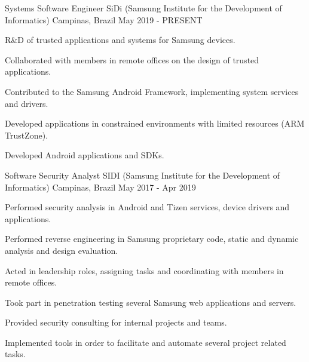 
\begin{cventries}

  \cventry
    {Systems Software Engineer} %
    {SiDi (Samsung Institute for the Development of Informatics)} %
    {Campinas, Brazil} %
    {May 2019 - PRESENT} %
    {
      \begin{cvitems} %
        \item {R\&D of trusted applications and systems for Samsung devices.}
        \item {Collaborated with members in remote offices on the design of trusted applications.}
        \item {Contributed to the Samsung Android Framework, implementing system services and drivers.}
        \item {Developed applications in constrained environments with limited resources (ARM TrustZone).}
        \item {Developed Android applications and SDKs.}
      \end{cvitems}
    }

  \cventry
    {Software Security Analyst} %
    {SIDI (Samsung Institute for the Development of Informatics)} %
    {Campinas, Brazil} %
    {May 2017 - Apr 2019} %
    {
      \begin{cvitems} %
        \item {Performed security analysis in Android and Tizen services, device drivers and applications.}
        \item {Performed reverse engineering in Samsung proprietary code, static and dynamic analysis and design evaluation.}
        \item {Acted in leadership roles, assigning tasks and coordinating with members in remote offices.}
        \item {Took part in penetration testing several Samsung web applications and servers.}
        \item {Provided security consulting for internal projects and teams.}
        \item {Implemented tools in order to facilitate and automate several project related tasks.}
      \end{cvitems}
    }


\end{cventries}
